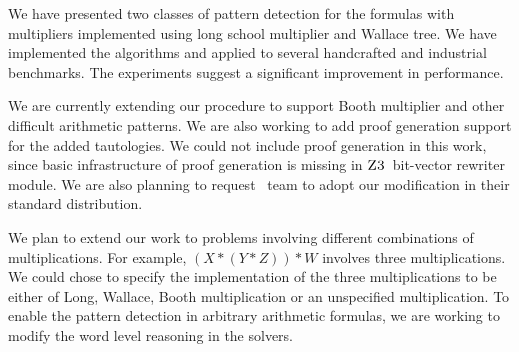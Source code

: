 We have presented two classes of pattern detection for the formulas with
multipliers implemented using long school multiplier and Wallace tree.
%
We have implemented the algorithms and applied to several handcrafted and 
industrial benchmarks.
%
The experiments suggest a significant improvement in performance.

We are currently extending our procedure to support Booth multiplier
and other difficult arithmetic patterns.
%
We are also working to add proof generation support
for the added tautologies.
%
We could not include proof generation in this work, since basic infrastructure
of proof generation is missing in $\textsc{Z3}$~bit-vector rewriter module.
%
We are also planning to request \zthree~team to adopt our modification in their
standard distribution.


We plan to extend our work to problems involving different combinations of multiplications. For example, $(X*(Y*Z))*W$ involves three multiplications. We could chose to specify the implementation of the three multiplications to be either of Long, Wallace, Booth multiplication or an unspecified multiplication. To enable the pattern detection in arbitrary arithmetic formulas, we are working to modify the word level reasoning in the solvers.  





